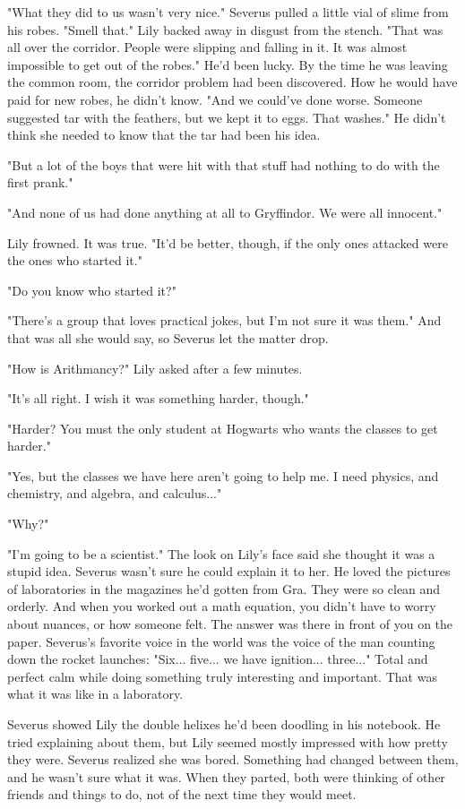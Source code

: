 \documentclass[a4paper,11pt]{article}
\begin{document}
"What they did to us wasn't very nice." Severus pulled a little vial of slime from his robes. "Smell that." Lily backed away in disgust from the stench. "That was all over the corridor. People were slipping and falling in it. It was almost impossible to get out of the robes." He'd been lucky. By the time he was leaving the common room, the corridor problem had been discovered. How he would have paid for new robes, he didn't know. "And we could've done worse. Someone suggested tar with the feathers, but we kept it to eggs. That washes." He didn't think she needed to know that the tar had been his idea.

"But a lot of the boys that were hit with that stuff had nothing to do with the first prank."

"And none of us had done anything at all to Gryffindor. We were all innocent."

Lily frowned. It was true. "It'd be better, though, if the only ones attacked were the ones who started it."

"Do you know who started it?"

"There's a group that loves practical jokes, but I'm not sure it was them." And that was all she would say, so Severus let the matter drop.

"How is Arithmancy?" Lily asked after a few minutes.

"It's all right. I wish it was something harder, though."

"Harder? You must the only student at Hogwarts who wants the classes to get harder."

"Yes, but the classes we have here aren't going to help me. I need physics, and chemistry, and algebra, and calculus..."

"Why?"

"I'm going to be a scientist." The look on Lily's face said she thought it was a stupid idea. Severus wasn't sure he could explain it to her. He loved the pictures of laboratories in the magazines he'd gotten from Gra. They were so clean and orderly. And when you worked out a math equation, you didn't have to worry about nuances, or how someone felt. The answer was there in front of you on the paper. Severus's favorite voice in the world was the voice of the man counting down the rocket launches: "Six... five... we have ignition... three..." Total and perfect calm while doing something truly interesting and important. That was what it was like in a laboratory.

Severus showed Lily the double helixes he'd been doodling in his notebook. He tried explaining about them, but Lily seemed mostly impressed with how pretty they were. Severus realized she was bored. Something had changed between them, and he wasn't sure what it was. When they parted, both were thinking of other friends and things to do, not of the next time they would meet.
\end{document}
